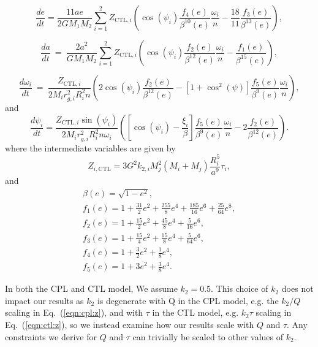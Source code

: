 \documentclass[twocolumn]{aastex61}
\begin{document}
\begin{equation} \label{eqn:ctl:e}
  \frac{de}{dt} = \frac{11 ae}{2 G M_1 M_2}
  \sum_{i = 1}^2 Z_{\mathrm{CTL},i} \left( \cos(\psi_i) \frac{f_4(e)}{\beta^{10}(e)}  \frac{\omega_i}{n} -\frac{18}{11} \frac{f_3(e)}{\beta^{13}(e)}\right),
\end{equation}

\begin{equation}\label{eqn:ctl:a}
  \frac{da}{dt} \ = \  \frac{2 a^2}{G M_1 M_2}
  \sum\limits_{i = 1}^2 Z_{\mathrm{CTL},i} \left( \cos(\psi_i) \frac{f_2(e)}{\beta^{12}(e)} \frac{\omega_i}{n} - \frac{f_1(e)}{\beta^{15}(e)}\right),
\end{equation}

\begin{equation}\label{eqn:ctl:omega}
  \frac{d\omega_i}{dt} \ = \ \frac{Z_{\mathrm{CTL},i}}{2 M_i r_{g,i}^2 
R_i^2 n} \left( 2 \cos(\psi_i) \frac{f_2(e)}{\beta^{12}(e)} - \left[ 1+\cos^2(\psi)
 \right] \frac{f_5(e)}{\beta^9(e)} 
\frac{\omega_i}{n} \right),  
\end{equation}
and
\begin{equation}\label{eqn:ctl:psi}
  \frac{d\psi_i}{dt} = \frac{Z_{\mathrm{CTL},i} \sin(\psi_i)}{2 M_i r_{g,i}^2 R_i^2 n \omega_i}\left( \left[ \cos(\psi_i) - \frac{\xi_i}{ \beta} \right] \frac{f_5(e)}{\beta^9(e)} \frac{\omega_i}{n} - 2 \frac{f_2(e)}{\beta^{12}(e)} \right).
\end{equation}
where the intermediate variables are given by 
\begin{equation}\label{eqn:ctl:z}
 Z_{i,\mathrm{CTL}} = 3 G^2 k_{2,i} M_j^2 (M_i+M_j) \frac{R_i^5}{a^9} \tau_i ,
\end{equation}
and 
\begin{equation}\label{eqn:ctl:f_e}
\begin{array}{l}
\beta(e) = \sqrt{1-e^2},\\
f_1(e) = 1 + \frac{31}{2} e^2 + \frac{255}{8} e^4 + \frac{185}{16} e^6 + \frac{25}{
64} e^8,\\
f_2(e) = 1 + \frac{15}{2} e^2 + \frac{45}{8} e^4 + \frac{5}{16} e^6,\\
f_3(e) = 1 + \frac{15}{4} e^2 + \frac{15}{8} e^4 + \frac{5}{64} e^6,\\
f_4(e) = 1 + \frac{3}{2} e^2 + \frac{1}{8} e^4,\\
f_5(e) = 1 + 3 e^2 + \frac{3}{8} e^4.
\end{array}
\end{equation}

In both the CPL and CTL model, We assume $k_2 = 0.5$. This choice of $k_2$ does not impact our results as $k_2$ is degenerate with Q in the CPL model, e.g. the $k_2/Q$ scaling in Eq.~(\ref{eqn:cpl:z}), and with $\tau$ in the CTL model, e.g. $k_2 \tau$ scaling in Eq.~(\ref{eqn:ctl:z}), so we instead examine how our results scale with $Q$ and $\tau$.  Any constraints we derive for $Q$ and $\tau$ can trivially be scaled to other values of $k_2$.
\end{document}
